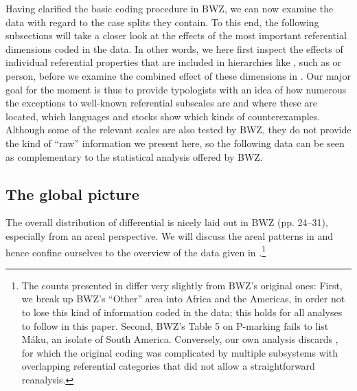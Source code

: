 \documentclass[output=paper]{langscibook}
\begin{document}
Having clarified the basic coding procedure in BWZ, we can now examine the data with regard to the case splits they contain. To this end, the following subsections will take a closer look at the effects of the most important referential dimensions coded in the data. In other words, we here first inspect the effects of individual referential properties that are included in hierarchies like , such as  or person, before we examine the combined effect of these dimensions in . Our major goal for the moment is thus to provide typologists with an idea of how numerous the exceptions to well-known referential subscales are and where these are located, \ie which languages and stocks show which kinds of counterexamples. Although some of the relevant scales are also tested by BWZ, they do not provide the kind of “raw” information we present here, so the following data can be seen as complementary to the  statistical analysis offered by BWZ.

\subsection{The global picture}\label{18-sc-subsec:2-2}

The overall distribution of differential  is nicely laid out in BWZ (pp. 24–31), especially from an areal perspective. We will discuss the areal patterns in  and hence confine ourselves to the overview of the data given in .\footnote{The counts presented in  differ very slightly from BWZ’s original ones: First, we break up BWZ’s “Other” area into Africa and the Americas, in order not to lose this kind of information coded in the data; this holds for all analyses to follow in this paper. Second, BWZ’s %
Table 5 on P-marking fails to list Máku, an isolate of South America. Conversely, our own analysis discards , for which the original coding was complicated by multiple subsystems with overlapping referential categories that did not allow a straightforward reanalysis.}
\end{document}
